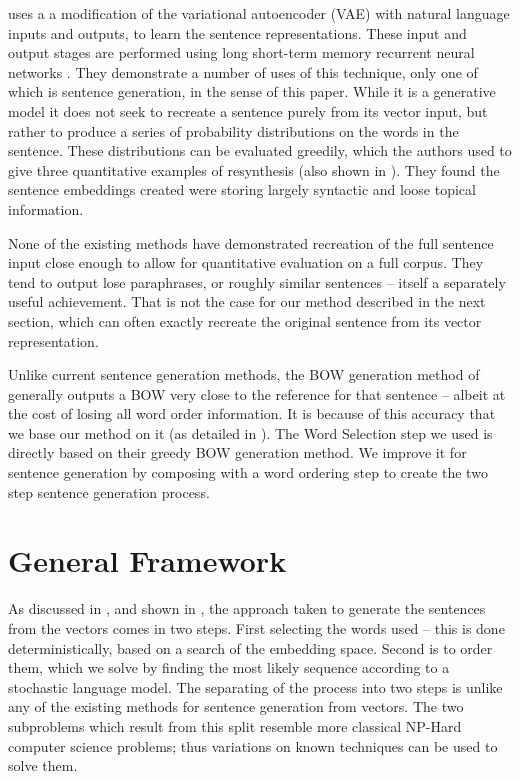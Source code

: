 \documentclass[11pt]{article}
\theoremstyle{plain}
\theoremstyle{definition}
\newcommand{\parencite}{\protect\cite}
\newcommand{\textcite}{\protect\newcite}
\begin{document}
\textcite{Bowman2015SmoothGeneration} uses a a modification of the variational autoencoder (VAE) \parencite{kingma2013auto} with natural language inputs and outputs, to learn the sentence representations. These input and output stages are performed using long short-term memory recurrent neural networks \parencite{hochreiter1997long}. They demonstrate a number of uses of this technique, only one of which is sentence generation, in the sense of this paper.
While it is a generative model it does not seek to recreate a sentence purely from its vector input, but rather to produce a series of probability distributions on the words in the sentence. These distributions can be evaluated greedily, which the authors used to give three quantitative examples of resynthesis (also shown in ). They found the sentence embeddings created were storing largely syntactic and loose topical information. 

None of the existing methods have demonstrated recreation of the full sentence input close enough to allow for quantitative evaluation on a full corpus. They tend to output lose paraphrases, or roughly similar sentences -- itself a separately useful achievement.  That is not the case for our method described in the next section, which can often exactly recreate the original sentence from its vector representation.

Unlike current sentence generation methods, the BOW generation method of \textcite{White2015BOWgen} generally outputs a BOW very close to the reference for that sentence -- albeit at the cost of losing all word order information. It is because of this accuracy that we base our method on it (as detailed in ). The Word Selection step we used is directly based on their greedy BOW generation method. We improve it for sentence generation by composing with a word ordering step to create the two step sentence generation process.


\section{General Framework}\label{framework}
As discussed in , and shown in , the approach taken to generate the sentences from the vectors comes in two steps. First selecting the words used -- this is done deterministically, based on a search of the embedding space. Second is to order them, which we solve by finding the most likely sequence according to a stochastic language model. The separating of the process into two steps is unlike any of the existing methods for sentence generation from vectors. The two subproblems which result from this split resemble more classical NP-Hard computer science problems; thus variations on known techniques can be used to solve them.
\end{document}
